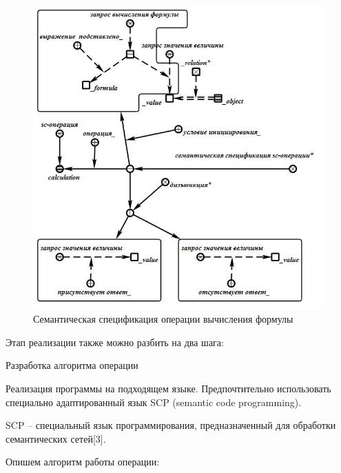 \begin{figure}[H]
	\includegraphics[scale=0.5]{images/part7/chapter_learning_systems/step1.jpg}
	\caption{Семантическая спецификация операции вычисления формулы}
	\label{fig:step1}
\end{figure}

Этап реализации также можно разбить на два шага:

\begin{textitemize}
	\item Разработка алгоритма операции
	\item Реализация программы на подходящем языке. Предпочтительно использовать специально адаптированный язык SCP (semantic code programming).
\end{textitemize}

SCP -- специальный язык программирования, предназначенный для обработки семантических сетей{[}3{]}.

Опишем алгоритм работы операции:

